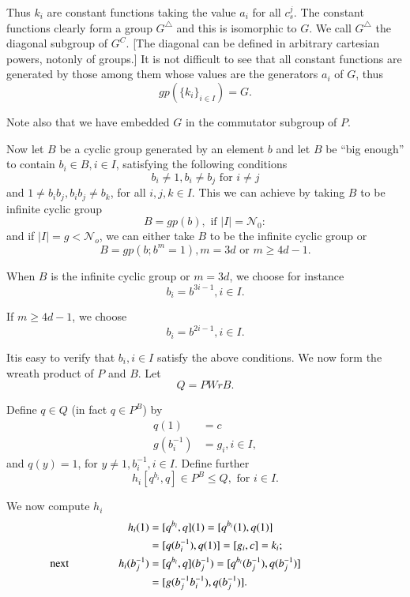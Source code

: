 Thus $k_i$ are constant functions taking the value $a_i$ for all
$c^j_s$. The constant functions clearly form a group $G^\triangle$ and
this is isomorphic to $G$. We call $G^\triangle$ the diagonal subgroup
of $G^C$. [The diagonal can be defined in arbitrary cartesian powers,
  not\pageoriginale only of groups.] It is not difficult to see that all constant
functions are generated by those among them whose values are the
generators $a_i$ of $G$, thus 
$$
gp (\{k_i\}_{i \in I}) = G. 
$$

Note also that we have embedded $G$ in the commutator subgroup of $P$.

Now let $B$ be a cyclic group generated by an element $b$ and let $B$
be ``big enough'' to contain $b_i \in B, i \in I$,
satisfying the following conditions 
$$
b_i \neq 1, b_i \neq b_j \text { for } i \neq j 
$$
and $1 \neq b_i b_j, b_i b_j \neq b_k$, for all $i,j,k \in
I$. This we can achieve by taking $B$ to be infinite cyclic group 
 $$
 B = gp (b), \text { if } |I| = \mathscr{N}_0 :
 $$
  and if $|I| = g < \mathscr{N}_o$, we can either take $B$ to be the
  infinite cyclic group or 
 $$
 B = gp (b; b^m = 1), m =3d \text { or } m \ge 4d-1.
 $$
 
 When $B$ is the infinite cyclic group or $m = 3d$, we choose for instance
 $$
 b_i = b^{3i-1}, i \in I.
 $$
 
 If $m  \ge 4d-1$, we choose
  $$
 b_i= b^{2i-1}, i \in I.
$$

It\pageoriginale is easy to verify that $b_i, i \in I$ satisfy the above
conditions. We now form the wreath product of $P$ and $B$. Let 
$$
Q = P Wr B.
$$

Define $q \in Q$ (in fact $q \in P^B$) by
\begin{align*}
  q (1) &= c\\
  g (b_i^{-1}) & = g_i, i \in I,
\end{align*}
and $q (y) = 1$, for $y \neq 1, b_i^{-1}, i \in I$. Define further
$$
h_i [q^{b_i}, q] \in P^B \le  Q, \text { for } i \in I.
$$

We now compute $h_i$
\begin{align*}
  h_i (1) &= [q^{b_i}, q] (1) = [q^{b_i} (1), q(1)]\\
  &= [q (b^{-1}_i), q(1)] = [g_i, c]= k_i;\\
  \text{ next } \hspace{1.5cm} h_i (b^{-1}_j) & = [q^{b_i}, q] (b_j^{-1})
  = [q^{b_i} (b^{-1}_j), q (b^{-1}_j)]\hspace{2cm}\\ 
  & = [g (b_j^{-1} b_i^{-1}), q(b_j^{-1})].
\end{align*}

